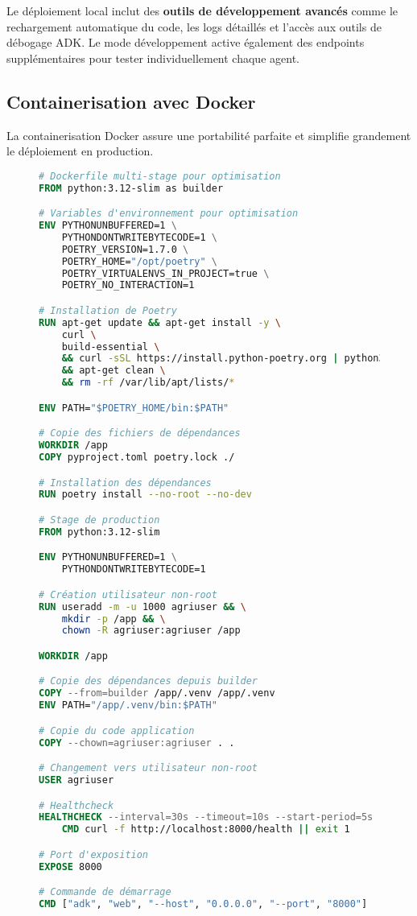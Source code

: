 Le déploiement local inclut des \textbf{outils de développement avancés} comme le rechargement automatique du code, les logs détaillés et l'accès aux outils de débogage ADK. Le mode développement active également des endpoints supplémentaires pour tester individuellement chaque agent.

\subsection{Containerisation avec Docker}

La containerisation Docker assure une portabilité parfaite et simplifie grandement le déploiement en production.

\begin{figure}[h]
\centering
\begin{lstlisting}[language=Dockerfile, caption=Docker optimisé pour Agriculture Cameroun]
# Dockerfile multi-stage pour optimisation
FROM python:3.12-slim as builder

# Variables d'environnement pour optimisation
ENV PYTHONUNBUFFERED=1 \
    PYTHONDONTWRITEBYTECODE=1 \
    POETRY_VERSION=1.7.0 \
    POETRY_HOME="/opt/poetry" \
    POETRY_VIRTUALENVS_IN_PROJECT=true \
    POETRY_NO_INTERACTION=1

# Installation de Poetry
RUN apt-get update && apt-get install -y \
    curl \
    build-essential \
    && curl -sSL https://install.python-poetry.org | python3 - \
    && apt-get clean \
    && rm -rf /var/lib/apt/lists/*

ENV PATH="$POETRY_HOME/bin:$PATH"

# Copie des fichiers de dépendances
WORKDIR /app
COPY pyproject.toml poetry.lock ./

# Installation des dépendances
RUN poetry install --no-root --no-dev

# Stage de production
FROM python:3.12-slim

ENV PYTHONUNBUFFERED=1 \
    PYTHONDONTWRITEBYTECODE=1

# Création utilisateur non-root
RUN useradd -m -u 1000 agriuser && \
    mkdir -p /app && \
    chown -R agriuser:agriuser /app

WORKDIR /app

# Copie des dépendances depuis builder
COPY --from=builder /app/.venv /app/.venv
ENV PATH="/app/.venv/bin:$PATH"

# Copie du code application
COPY --chown=agriuser:agriuser . .

# Changement vers utilisateur non-root
USER agriuser

# Healthcheck
HEALTHCHECK --interval=30s --timeout=10s --start-period=5s --retries=3 \
    CMD curl -f http://localhost:8000/health || exit 1

# Port d'exposition
EXPOSE 8000

# Commande de démarrage
CMD ["adk", "web", "--host", "0.0.0.0", "--port", "8000"]
\end{lstlisting}
\end{figure}

